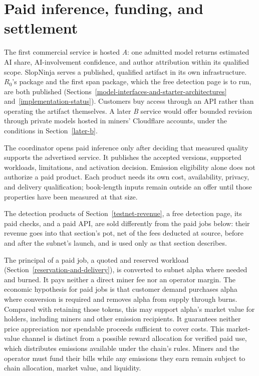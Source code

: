 \section{Paid inference, funding, and settlement}
\label{paid-asynchronous-jobs-and-on-chain-coordination}

The first commercial service is hosted \textit{A}: one admitted model returns
estimated AI share, AI-involvement confidence, and author
attribution within its qualified scope. SlopNinja serves a published,
qualified artifact in its own infrastructure. \(R_0\)'s package and the first
span package, which the free detection page is to run, are both published
(Sections~\ref{model-interfaces-and-starter-architectures}
and~\ref{implementation-status}). Customers buy access through an API rather than
operating the artifact themselves. A later \textit{B} service would offer
bounded revision through private models hosted in miners' Cloudflare accounts,
under the conditions in Section~\ref{later-b}.

The coordinator opens paid inference only after deciding that measured quality
supports the advertised service. It publishes the accepted versions, supported
workloads, limitations, and activation decision. Emission eligibility alone
does not authorize a paid product. Each product needs its own cost,
availability, privacy, and delivery qualification; book-length inputs remain
outside an offer until those properties have been measured at that size.

The detection products of Section~\ref{testnet-revenue}, a free detection page,
its paid checks, and a paid API, are sold differently from the paid jobs
below: their revenue goes into that section's pot, net of the fees deducted at source, before and
after the subnet's launch, and is used only as that section describes.

The principal of a paid job, a quoted and reserved workload
(Section~\ref{reservation-and-delivery}), is converted to subnet alpha where
needed and burned. It pays neither a direct miner fee nor an operator margin.
The economic hypothesis for paid jobs is that customer demand purchases alpha
where conversion is required and removes alpha from supply through burns. Compared with retaining those
tokens, this may support alpha's market value for holders, including miners
and other emission recipients. It guarantees neither price appreciation nor
spendable proceeds sufficient to cover costs. This market-value channel is
distinct from a possible reward allocation for verified paid use, which
distributes emissions available under the chain's rules. Miners and the operator
must fund their bills while any emissions they earn remain subject to chain
allocation, market value, and liquidity.

